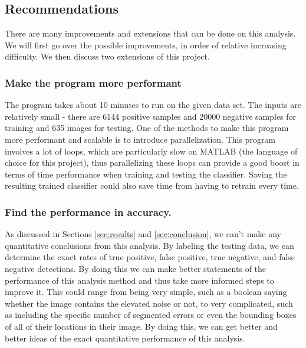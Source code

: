 \documentclass[twocolumn,longauthor]{aastex61}
\begin{document}
\subsection{Recommendations} \label{subsec:recs}
\noindent There are many improvements and extensions that can be done on this analysis. We will first go over the possible improvements, in order of relative increasing difficulty. We then discuss two extensions of this project.\\

\subsubsection{Make the program more performant} \label{subsubsec:performance}
\noindent The program takes about 10 minutes to run on the given data set. The inputs are relatively small - there are 6144 positive samples and 20000 negative samples for training and 635 images for testing. One of the methods to make this program more performant and scalable is to introduce parallelization. This program involves a lot of loops, which are particularly slow on MATLAB (the language of choice for this project), thus parallelizing these loops can provide a good boost in terms of time performance when training and testing the classifier. Saving the resulting trained classifier could also save time from having to retrain every time.

\subsubsection{Find the performance in accuracy.} \label{subsubsec:accuracy}
\noindent As discussed in Sections \ref{sec:results} and \ref{sec:conclusion}, we can't make any quantitative conclusions from this analysis. By labeling the testing data, we can determine the exact rates of true positive, false positive, true negative, and false negative detections. By doing this we can make better statements of the performance of this analysis method and thus take more informed steps to improve it. This could range from being very simple, such as a boolean saying whether the image contains the elevated noise or not, to very complicated, such as including the specific number of segmented errors or even the bounding boxes of all of their locations in their image. By doing this, we can get better and better ideas of the exact quantitative performance of this analysis.
\end{document}
